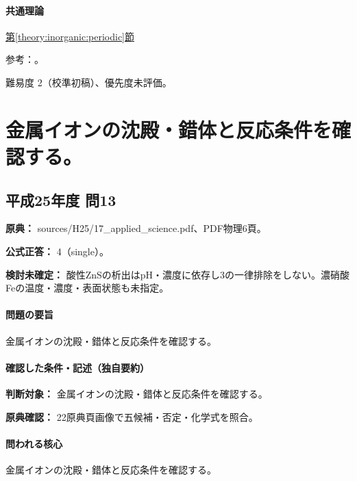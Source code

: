 \paragraph{共通理論} \hyperref[theory:inorganic:periodic]{第\ref*{theory:inorganic:periodic}節}

\par 参考：\cite{atomic_nist2019}。

\par 難易度 2（校準初稿）、優先度未評価。

\section{金属イオンの沈殿・錯体と反応条件を確認する。}

\subsection{平成25年度 問13}
\label{q:h25-reg-applied-13}

\noindent\textbf{原典：} sources/H25/17\_applied\_science.pdf、PDF物理6頁。

\textbf{公式正答：} 4（single）。

\par\textbf{検討未確定：} 酸性ZnSの析出はpH・濃度に依存し3の一律排除をしない。濃硝酸Feの温度・濃度・表面状態も未指定。

\paragraph{問題の要旨} 金属イオンの沈殿・錯体と反応条件を確認する。

\paragraph{確認した条件・記述（独自要約）}\mbox{}\par

\noindent\textbf{判断対象：} 金属イオンの沈殿・錯体と反応条件を確認する。\par

\noindent\textbf{原典確認：} 22原典頁画像で五候補・否定・化学式を照合。\par

\paragraph{問われる核心} 金属イオンの沈殿・錯体と反応条件を確認する。

